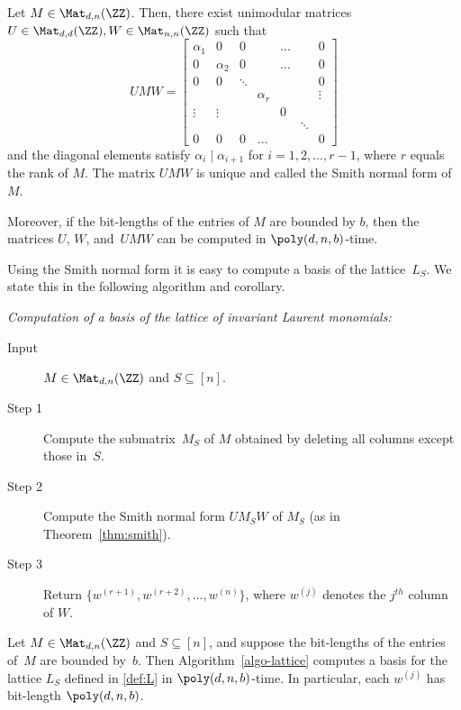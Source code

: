 \begin{theorem}\label{thm:smith}
Let $M\in\Mat_{d,n}(\ZZ)$. Then, there exist unimodular matrices $U\in\Mat_{d,d}(\ZZ), W\in\Mat_{n,n}(\ZZ)$ such that
\[
  UMW=\begin{bmatrix}
\alpha_1 & 0 & 0 & & \dots & & 0\\
0 & \alpha_2 & 0 & & \dots & & 0\\
0 & 0 & \ddots & & & & 0\\
 & & & \alpha_r & & & \vdots\\
\vdots &\vdots & & & 0 & & \\
 & & & &  &\ddots & \\
0 & 0 & 0 & \dots & & & 0
\end{bmatrix}
\]
and the diagonal elements satisfy $\alpha_i\mid \alpha_{i+1}$ for $i=1,2,\dots,r-1$, where $r$ equals the rank of $M$.
The matrix $UMW$ is unique and called the Smith normal form of $M$.

Moreover, if the bit-lengths of the entries of $M$ are bounded by $b$, then the matrices $U$, $W$, and~$UMW$ can be computed in $\poly(d,n,b)$-time.
\end{theorem}

Using the Smith normal form it is easy to compute a basis of the lattice~$L_S$.
We state this in the following algorithm and corollary.

\begin{algorithm}\label{algo-lattice} \emph{Computation of a basis of the lattice of invariant Laurent monomials:}
\begin{description}
\item [Input]  $M \in \Mat_{d,n}(\ZZ)$ and $S\subseteq[n]$.
\item [Step 1] Compute the submatrix~$M_S$ of $M$ obtained by deleting all columns except those in~$S$.
\item [Step 2] Compute the Smith normal form $UM_SW$ of $M_S$ (as in Theorem~\ref{thm:smith}).
\item [Step 3] Return $\{w^{(r+1)}, w^{(r+2)}, \dots, w^{(n)}\}$, where $w^{(j)}$ denotes the $j^{th}$ column of $W$.
\end{description}
\end{algorithm}


\begin{corollary}\label{cor:smith}
Let $M\in\Mat_{d, n}(\ZZ)$ and $S \subseteq [n]$, and suppose the bit-lengths of the entries of~$M$ are bounded by~$b$.
Then Algorithm~\ref{algo-lattice} computes a basis for the lattice $L_S$ defined in \eqref{def:L} in $\poly(d,n,b)$-time.
In particular, each $w^{(j)}$ has bit-length $\poly(d,n,b)$.
\end{corollary}

